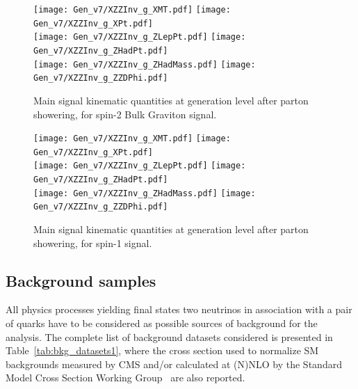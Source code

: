 
 \begin{figure}[!htb]
   \begin{center}
     \texttt{[image: Gen\_v7/XZZInv\_g\_XMT.pdf]}%
     \texttt{[image: Gen\_v7/XZZInv\_g\_XPt.pdf]}%
     \\
     \texttt{[image: Gen\_v7/XZZInv\_g\_ZLepPt.pdf]}%
     \texttt{[image: Gen\_v7/XZZInv\_g\_ZHadPt.pdf]}%
     \\
     \texttt{[image: Gen\_v7/XZZInv\_g\_ZHadMass.pdf]}%
     \texttt{[image: Gen\_v7/XZZInv\_g\_ZZDPhi.pdf]}%
   \end{center}
   \caption{Main signal kinematic quantities at generation level after parton showering, for spin-2 Bulk Graviton signal.}
   \label{fig:genSignal1}
 \end{figure}

 \begin{figure}[!htb]
   \begin{center}
     \texttt{[image: Gen\_v7/XZZInv\_g\_XMT.pdf]}%
     \texttt{[image: Gen\_v7/XZZInv\_g\_XPt.pdf]}%
     \\
     \texttt{[image: Gen\_v7/XZZInv\_g\_ZLepPt.pdf]}%
     \texttt{[image: Gen\_v7/XZZInv\_g\_ZHadPt.pdf]}%
     \\
     \texttt{[image: Gen\_v7/XZZInv\_g\_ZHadMass.pdf]}%
     \texttt{[image: Gen\_v7/XZZInv\_g\_ZZDPhi.pdf]}%
   \end{center}
   \caption{Main signal kinematic quantities at generation level after parton showering, for spin-1 \Wp signal.}
   \label{fig:genSignal2}
 \end{figure} 
 
\clearpage

\subsection{Background samples}\label{ssec:backgrounds}


All physics processes yielding final states two neutrinos in association with a pair of quarks have to be considered as possible sources of background for the analysis.
The complete list of background datasets considered is presented in Table~\ref{tab:bkg_datasets1}, where the cross section used to normalize SM backgrounds measured by CMS and/or calculated at (N)NLO by the Standard Model Cross Section Working Group~\cite{} are also reported.

